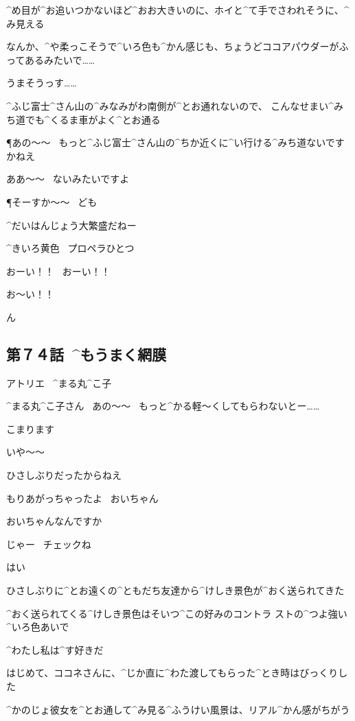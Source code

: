\A ^{め}{目}が^{お}{追}いつかないほど^{おお}{大}きいのに、ホイと^{て}{手}でさわれそうに、^{み}{見}える

\A なんか、^{や}{柔}っこそうで^{いろ}{色}も^{かん}{感}じも、ちょうどココアパウダーがふってあるみたいで……

\A うまそうっす……

\page
\A ^{ふじ}{富士}^{さん}{山}の^{みなみがわ}{南側}が^{とお}{通}れないので、
こんなせまい^{みち}{道}でも^{くるま}{車}がよく^{とお}{通}る

\P あの〜〜
\ もっと^{ふじ}{富士}^{さん}{山}の^{ちか}{近}くに^{い}{行}ける^{みち}{道}ないですかねえ

\A ああ〜〜
\ ないみたいですよ

\P そーすか〜〜
\ ども

\A ^{だいはんじょう}{大繁盛}だねー

\page[113]
\A ^{きいろ}{黄色}
\ プロペラひとつ

\A おーい！！
\ おーい！！

\page
\A お〜い！！

\page[118]
\A ん


\subsection{第７４話\ ^{もうまく}{網膜}}

\page[120]
\Sign アトリエ
\ ^{まる}{丸}^{こ}{子}

\page[123]
\K ^{まる}{丸}^{こ}{子}さん
\ あの〜〜
\ もっと^{かる}{軽}〜くしてもらわないとー……

\K こまります

\R いや〜〜

\R ひさしぶりだったからねえ

\R もりあがっちゃったよ
\ おいちゃん

\K おいちゃんなんですか

\page
\R じゃー
\ チェックね

\K はい

\R ひさしぶりに^{とお}{遠}くの^{ともだち}{友達}から^{けしき}{景色}が^{おく}{送}られてきた

\R ^{おく}{送}られてくる^{けしき}{景色}はそいつ^{この}{好}みのコントラ
ストの^{つよ}{強}い^{いろ}{色}あいで

\R ^{わたし}{私}は^{す}{好}きだ

\R はじめて、ココネさんに、^{じか}{直}に^{わた}{渡}してもらった^{とき}{時}はびっくりした

\R ^{かのじょ}{彼女}を^{とお}{通}して^{み}{見}る^{ふうけい}{風景}は、リアル^{かん}{感}がちがう

